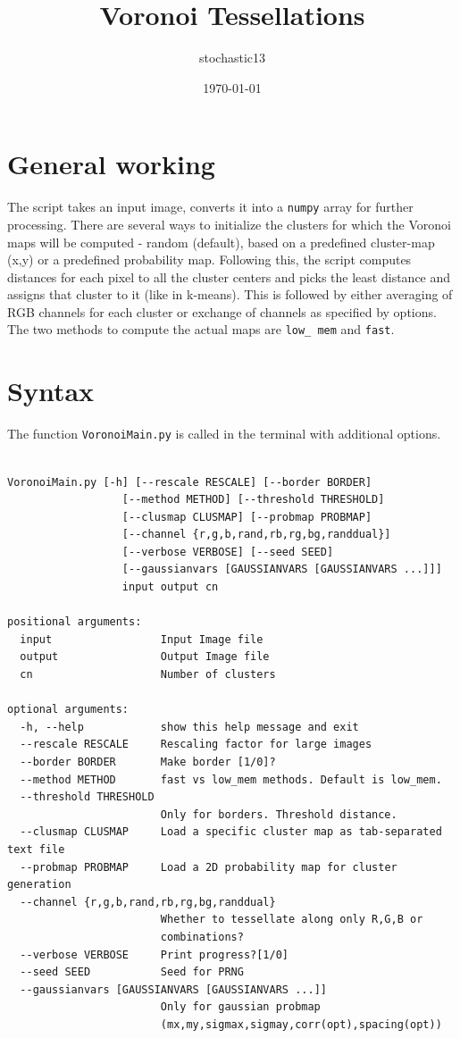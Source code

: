 \documentclass[15pt]{article}
\title{Voronoi Tessellations}
\author{stochastic13}
\date{\today}
\begin{document}
\maketitle
\tableofcontents
\newpage
\section{General working}
The script takes an input image, converts it into a \texttt{numpy} array for further processing. There are several ways to initialize the clusters for which the Voronoi maps will be computed - random (default), based on a predefined cluster-map (x,y) or a predefined probability map. Following this, the script computes distances for each pixel to all the cluster centers and picks the least distance and assigns that cluster to it (like in k-means). This is followed by either averaging of RGB channels for each cluster or exchange of channels as specified by options. The two methods to compute the actual maps are \texttt{low\_ mem} and \texttt{fast}.

\section{Syntax}
The function \texttt{VoronoiMain.py} is called in the terminal with additional options.
\begin{verbatim}

VoronoiMain.py [-h] [--rescale RESCALE] [--border BORDER]
                  [--method METHOD] [--threshold THRESHOLD]
                  [--clusmap CLUSMAP] [--probmap PROBMAP]
                  [--channel {r,g,b,rand,rb,rg,bg,randdual}]
                  [--verbose VERBOSE] [--seed SEED]
                  [--gaussianvars [GAUSSIANVARS [GAUSSIANVARS ...]]]
                  input output cn

positional arguments:
  input                 Input Image file
  output                Output Image file
  cn                    Number of clusters

optional arguments:
  -h, --help            show this help message and exit
  --rescale RESCALE     Rescaling factor for large images
  --border BORDER       Make border [1/0]?
  --method METHOD       fast vs low_mem methods. Default is low_mem.
  --threshold THRESHOLD
                        Only for borders. Threshold distance.
  --clusmap CLUSMAP     Load a specific cluster map as tab-separated text file
  --probmap PROBMAP     Load a 2D probability map for cluster generation
  --channel {r,g,b,rand,rb,rg,bg,randdual}
                        Whether to tessellate along only R,G,B or
                        combinations?
  --verbose VERBOSE     Print progress?[1/0]
  --seed SEED           Seed for PRNG
  --gaussianvars [GAUSSIANVARS [GAUSSIANVARS ...]]
                        Only for gaussian probmap
                        (mx,my,sigmax,sigmay,corr(opt),spacing(opt))
\end{verbatim}
\newpage
\end{document}
